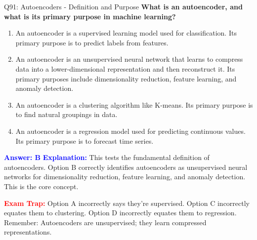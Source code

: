 \documentclass[8pt]{beamer}
\begin{document}
	\begin{frame}{Q91: Autoencoders - Definition and Purpose}
		\fontsize{6.5}{7.5}\selectfont
		\textbf{What is an autoencoder, and what is its primary purpose in machine learning?}
		
		\begin{enumerate}
			\item An autoencoder is a supervised learning model used for classification. Its primary purpose is to predict labels from features.
			\item An autoencoder is an unsupervised neural network that learns to compress data into a lower-dimensional representation and then reconstruct it. Its primary purposes include dimensionality reduction, feature learning, and anomaly detection.
			\item An autoencoder is a clustering algorithm like K-means. Its primary purpose is to find natural groupings in data.
			\item An autoencoder is a regression model used for predicting continuous values. Its primary purpose is to forecast time series.
		\end{enumerate}
		
		\vspace{0.1cm}
		\textcolor{blue}{\textbf{Answer: B}}
		\vspace{0.1cm}
		\textcolor{blue}{\textbf{Explanation:}} This tests the fundamental definition of autoencoders. Option B correctly identifies autoencoders as unsupervised neural networks for dimensionality reduction, feature learning, and anomaly detection. This is the core concept.
		
		\textcolor{red}{\textbf{Exam Trap:}} Option A incorrectly says they're supervised. Option C incorrectly equates them to clustering. Option D incorrectly equates them to regression. Remember: Autoencoders are unsupervised; they learn compressed representations.
	\end{frame}
	
\end{document}
